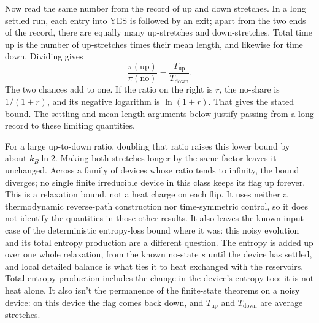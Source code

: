 \documentclass[11pt,twoside]{article}
\theoremstyle{thielethm}
\theoremstyle{thieledef}
\theoremstyle{thieledef}
\theoremstyle{thieledef}
\theoremstyle{thielethm}
\theoremstyle{thieleobs}
\theoremstyle{thielethm}
\begin{document}
Now read the same number from the record of up and down stretches. In a long settled
run, each entry into YES is followed by an exit; apart from the two ends of the record,
there are equally many up-stretches and down-stretches. Total time up is the number of
up-stretches times their mean length, and likewise for time down. Dividing gives
\[
\frac{\pi(\mathrm{up})}{\pi(\mathrm{no})}
 =\frac{T_{\mathrm{up}}}{T_{\mathrm{down}}}.
\]
The two chances add to one. If the ratio on the right is $r$, the no-share is
$1/(1+r)$, and its negative logarithm is $\ln(1+r)$. That gives the stated bound.
The settling and mean-length arguments below justify passing from a long record
to these limiting quantities.

For a large up-to-down ratio, doubling that ratio raises this lower bound by about
$k_B\ln2$. Making both stretches longer by the same factor leaves it unchanged. Across
a family of devices whose ratio tends to infinity, the bound diverges; no single finite
irreducible device in this class keeps its flag up forever. This is a relaxation bound,
not a heat charge on each flip. It uses neither a thermodynamic reverse-path construction
nor time-symmetric control, so it does not identify the quantities in those other results.
It also leaves the known-input case of the deterministic entropy-loss bound where it was:
this noisy evolution and its total entropy production are a different question.
The entropy is added up over one whole relaxation, from the known no-state $s$ until the device
has settled, and local detailed balance is what ties it to heat exchanged with the reservoirs.
Total entropy production includes the change in the device's entropy too; it is not heat alone.
It also isn't the permanence of the finite-state theorems on a
noisy device: on this device the flag comes back down, and $T_{\mathrm{up}}$ and
$T_{\mathrm{down}}$ are average stretches.
\end{document}
